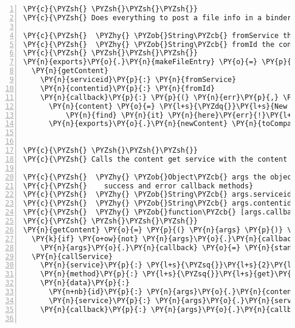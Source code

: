 \begin{Verbatim}[fontsize=\scriptsize,commandchars=\\\{\},numbers=left,firstnumber=1,stepnumber=1]
\PY{c}{\PYZsh{} \PYZsh{}\PYZsh{}\PYZsh{}}
\PY{c}{\PYZsh{} Does everything to post a file info in a binder tab}

\PY{c}{\PYZsh{}  \PYZhy{} \PYZob{}String\PYZcb{} fromService the content service which grabs the content}
\PY{c}{\PYZsh{}  \PYZhy{} \PYZob{}String\PYZcb{} fromId the content id from which the information is grabbed}
\PY{c}{\PYZsh{} \PYZsh{}\PYZsh{}\PYZsh{}}
\PY{n}{exports}\PY{o}{.}\PY{n}{makeFileEntry} \PY{o}{=} \PY{p}{(} \PY{n}{fromService}\PY{p}{,} \PY{n}{fromId}\PY{p}{,} \PY{n}{toCompany}\PY{p}{,} \PY{n}{toContext} \PY{p}{)} \PY{o}{\PYZhy{}}\PY{o}{\PYZgt{}}
  \PY{n}{getContent}
    \PY{n}{serviceid}\PY{p}{:} \PY{n}{fromService}
    \PY{n}{contentid}\PY{p}{:} \PY{n}{fromId}
    \PY{n}{callback}\PY{p}{:} \PY{p}{(} \PY{n}{err}\PY{p}{,} \PY{n}{resp}\PY{p}{,} \PY{n}{body} \PY{p}{)} \PY{o}{\PYZhy{}}\PY{o}{\PYZgt{}}
      \PY{n}{content} \PY{o}{=} \PY{l+s}{\PYZdq{}}\PY{l+s}{New file (\PYZsh{}\PYZob{} body.title \PYZcb{}) in tab }\PY{l+s+se}{\PYZbs{}\PYZdq{}}\PY{l+s}{\PYZsh{}\PYZob{} body.context[0].name \PYZcb{}}\PY{l+s+se}{\PYZbs{}\PYZdq{}}\PY{l+s}{,}
          \PY{n}{find} \PY{n}{it} \PY{n}{here}\PY{err}{!}\PY{l+s}{\PYZsq{}}\PY{l+s}{\PYZdq{}}
      \PY{n}{exports}\PY{o}{.}\PY{n}{newContent} \PY{n}{toCompanyId}\PY{p}{,} \PY{n}{toContextId}\PY{p}{,} \PY{n}{content}\PY{p}{,} \PY{n}{standardCallback} \PY{l+s}{\PYZsq{}}\PY{l+s}{makeFileEntry}\PY{l+s}{\PYZsq{}}


\PY{c}{\PYZsh{} \PYZsh{}\PYZsh{}\PYZsh{}}
\PY{c}{\PYZsh{} Calls the content get service with the content id and the service id provided. }

\PY{c}{\PYZsh{}  \PYZhy{} \PYZob{}Object\PYZcb{} args the object containing the service id and the content id,}
\PY{c}{\PYZsh{}    success and error callback methods}
\PY{c}{\PYZsh{}  \PYZhy{} \PYZob{}String\PYZcb{} args.serviceid the service id that is able to process this content}
\PY{c}{\PYZsh{}  \PYZhy{} \PYZob{}String\PYZcb{} args.contentid the content id}
\PY{c}{\PYZsh{}  \PYZhy{} \PYZob{}function\PYZcb{} [args.callback] receives the needle answer from the \PYZdq{}call\PYZdq{} function}
\PY{c}{\PYZsh{} \PYZsh{}\PYZsh{}\PYZsh{}}
\PY{n}{getContent} \PY{o}{=} \PY{p}{(} \PY{n}{args} \PY{p}{)} \PY{o}{\PYZhy{}}\PY{o}{\PYZgt{}}
  \PY{k}{if} \PY{o+ow}{not} \PY{n}{args}\PY{o}{.}\PY{n}{callback}
    \PY{n}{args}\PY{o}{.}\PY{n}{callback} \PY{o}{=} \PY{n}{standardCallback} \PY{l+s}{\PYZsq{}}\PY{l+s}{getContent}\PY{l+s}{\PYZsq{}}
  \PY{n}{callService}
    \PY{n}{service}\PY{p}{:} \PY{l+s}{\PYZsq{}}\PY{l+s}{2}\PY{l+s}{\PYZsq{}}
    \PY{n}{method}\PY{p}{:} \PY{l+s}{\PYZsq{}}\PY{l+s}{get}\PY{l+s}{\PYZsq{}}
    \PY{n}{data}\PY{p}{:} 
      \PY{n+nb}{id}\PY{p}{:} \PY{n}{args}\PY{o}{.}\PY{n}{contentid}
      \PY{n}{service}\PY{p}{:} \PY{n}{args}\PY{o}{.}\PY{n}{serviceid}
    \PY{n}{callback}\PY{p}{:} \PY{n}{args}\PY{o}{.}\PY{n}{callback}


\end{Verbatim}
